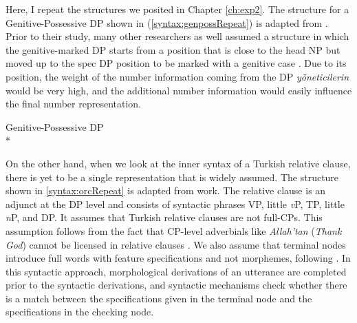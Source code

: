 Here, I repeat the structures we posited in Chapter \ref{ch:exp2}. The structure for a Genitive-Possessive DP shown in (\ref{syntax:genpossRepeat}) is adapted from . Prior to their study, many other researchers as well assumed a structure in which the genitive-marked DP starts from a position that is close to the head NP but moved up to the spec DP position to be marked with a genitive case \citep{Lewis70,Dede78, Kornfilt97, Kornfilt85,Ozsoy94, Yukseker98, Arslan2006, Arslan2009, Goksel2009}. Due to its position, the weight of the number information coming from the DP \emph{y\"oneticilerin} would be very high, and the additional number information would easily influence the final number representation.

\ea \label{syntax:genpossRepeat} {Genitive-Possessive DP}\\*
\z

On the other hand, when we look at the inner syntax of a Turkish relative clause, there is yet to be a single representation that is widely assumed. The structure shown in \ref{syntax:orcRepeat} is adapted from \cites{Aygen2002} work. The relative clause is an adjunct at the DP level and consists of syntactic phrases VP, little \emph{v}P, TP, little \emph{n}P, and DP. It assumes that Turkish relative clauses are not full-CPs. This assumption follows from the fact that CP-level adverbials like \emph{Allah'tan} (\emph{Thank God}) cannot be licensed in relative clauses \citep{Goksu2018, Aygen2002}. We also assume that terminal nodes introduce full words with feature specifications and not morphemes, following \citet{C20,C21}. In this syntactic approach, morphological derivations of an utterance are completed prior to the syntactic derivations, and syntactic mechanisms check whether there is a match between the specifications given in the terminal node and the specifications in the checking node. 

